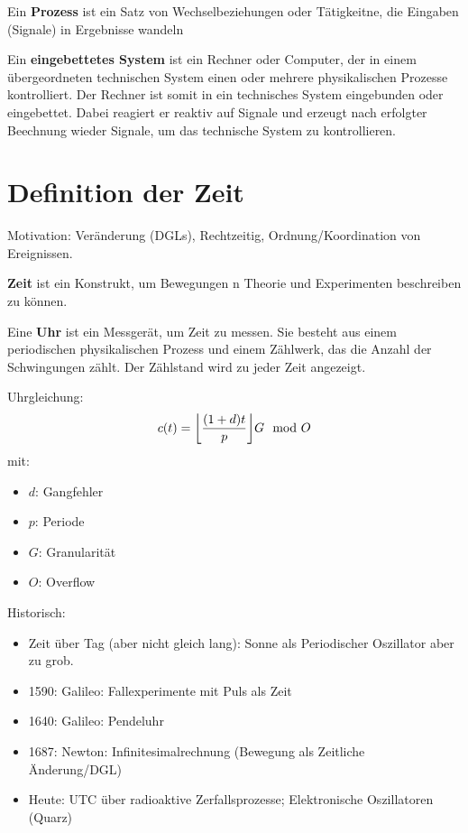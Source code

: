 \begin{tcolorbox}
Ein \textbf{Prozess} ist ein Satz von Wechselbeziehungen oder Tätigkeitne, die Eingaben
(\glqq{}Signale\grqq{}) in Ergebnisse wandeln
\end{tcolorbox}

\begin{tcolorbox}
Ein \textbf{eingebettetes System} ist ein Rechner oder Computer, der in einem 
übergeordneten technischen System einen oder mehrere physikalischen Prozesse kontrolliert.
Der Rechner ist somit in ein technisches System eingebunden oder eingebettet.
Dabei reagiert er reaktiv auf Signale und erzeugt nach erfolgter Beechnung wieder Signale,
um das technische System zu kontrollieren.
\end{tcolorbox}

\section{Definition der Zeit}
Motivation: Veränderung (DGLs), Rechtzeitig, Ordnung/Koordination von Ereignissen.

\begin{tcolorbox}
\textbf{Zeit} ist ein Konstrukt, um Bewegungen n Theorie und Experimenten beschreiben zu
können.
\end{tcolorbox}

\begin{tcolorbox}
Eine \textbf{Uhr} ist ein Messgerät, um Zeit zu messen. Sie besteht aus einem periodischen
physikalischen Prozess und einem Zählwerk, das die Anzahl der Schwingungen zählt. Der
Zählstand wird zu jeder Zeit angezeigt.
\end{tcolorbox}

Uhrgleichung:
\begin{equation}
    c(t) = \floor*{\frac{(1+d)t}{p}} G \mod O
\end{equation}
mit:
\begin{itemize}
    \item $d$: Gangfehler
    \item $p$: Periode
    \item $G$: Granularität
    \item $O$: Overflow
\end{itemize}

Historisch:
\begin{itemize}
    \item Zeit über Tag (aber nicht gleich lang): Sonne als Periodischer Oszillator aber zu grob.
    \item 1590: Galileo: Fallexperimente mit Puls als Zeit
    \item 1640: Galileo: Pendeluhr
    \item 1687: Newton: Infinitesimalrechnung (Bewegung als Zeitliche Änderung/DGL)
    \item Heute: UTC über radioaktive Zerfallsprozesse; Elektronische Oszillatoren (Quarz)
\end{itemize}

